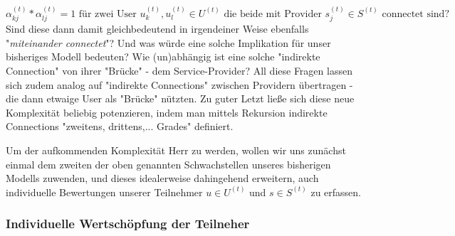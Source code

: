 \begin{equation*}
  \alpha^{(t)}_{kj} * \alpha^{(t)}_{lj} = 1 \textrm{ für zwei User } u^{(t)}_k, u^{(t)}_l \in U^{(t)} \textrm{ die beide mit Provider } s^{(t)}_j \in S^{(t)} \textrm{ connectet sind?}
\end{equation*}
Sind diese dann damit gleichbedeutend in irgendeiner Weise ebenfalls "\textit{miteinander connectet}"? Und was würde eine solche Implikation für unser bisheriges Modell bedeuten? Wie (un)abhängig ist eine solche "indirekte Connection" von ihrer "Brücke" - dem Service-Provider? All diese Fragen lassen sich zudem analog auf "indirekte Connections" zwischen Providern übertragen - die dann etwaige User als "Brücke" nützten. Zu guter Letzt ließe sich diese neue Komplexität beliebig potenzieren, indem man mittels Rekursion indirekte Connections "zweitens, drittens,... Grades" definiert.

Um der aufkommenden Komplexität Herr zu werden, wollen wir uns zunächst einmal dem zweiten der oben genannten Schwachstellen unseres bisherigen Modells zuwenden, und dieses idealerweise dahingehend erweitern, auch individuelle Bewertungen unserer Teilnehmer $u \in U^{(t)}$ und $s \in S^{(t)}$ zu erfassen.


\subsubsection{Individuelle Wertschöpfung der Teilneher}
\label{sec:eco_zahlen_teilnehmer}

